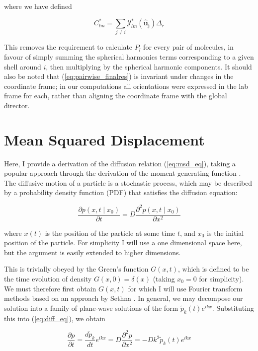 \documentclass[11pt, a4paper]{article} %
\begin{document}
\begin{appendices}
where we have defined

\begin{equation}
 C_{lm}^{*} = \sum_{j \neq i}  \mathcal{Y}_{lm}^{*}(\boldsymbol{\hat{u}_{j}}) \Delta_{r}
\end{equation}

This removes the requirement to calculate $P_{l}$ for every pair of molecules, in favour of simply summing the spherical harmonics terms corresponding to a given shell around $i$, then multiplying by the spherical harmonic components. It should also be noted that (\ref{eq:pairwise_finalres}) is invariant under changes in the coordinate frame; in our computations all orientations were expressed in the lab frame for each, rather than aligning the coordinate frame with the global director.

\section{Mean Squared Displacement} \label{sec:Diffusion_Theory}
Here, I provide a derivation of the diffusion relation (\ref{eq:msd_eq}), taking a popular approach through the derivation of the moment generating function \cite{Mazo2008, Gardiner2009}. The diffusive motion of a particle is a stochastic process, which may be described by a probability density function (PDF) that satisfies the diffusion equation:

\begin{equation} \label{eq:diff_eq}
\frac{\partial p(x,t \mid x_{0})}{\partial t} = D\frac{\partial^{2} p(x,t \mid x_{0})}{\partial x^{2}}
\end{equation}

where $x(t)$ is the position of the particle at some time $t$, and $x_{0}$ is the initial position of the particle. For simplicity I will use a one dimensional space here, but the argument is easily extended to higher dimensions. 

This is trivially obeyed by the Green's function $G(x,t)$, which is defined to be the time evolution of density $G(x,0)=\delta(x)$ (taking $x_{0} = 0$ for simplicity). We must therefore first obtain $G(x,t)$ for which I will use Fourier transform methods based on an approach by Sethna \cite{Sethna2006}. In general, we may decompose our solution into a family of plane-wave solutions of the form $\tilde{p}_{k}(t)e^{ikx}$. Substituting this into (\ref{eq:diff_eq}), we obtain

\begin{equation}
\frac{\partial p}{\partial t} = \frac{d\tilde{p}_{k}}{dt}e^{ikx} =  D\frac{\partial^{2}p}{\partial x^{2}} = -Dk^{2}\tilde{p}_{k}(t)e^{ikx}
\end{equation}


\end{appendices}
\end{document}
